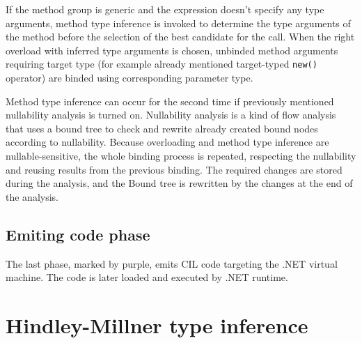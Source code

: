 If the method group is generic and the expression doesn’t specify any type arguments, method type inference is invoked to determine the type arguments of the method before the selection of the best candidate for the call.
When the right overload with inferred type arguments is chosen, unbinded method arguments requiring target type (for example already mentioned target-typed \texttt{new()} operator) are binded using corresponding parameter type.
\par
Method type inference can occur for the second time if previously mentioned nullability analysis is turned on. 
Nullability analysis is a kind of flow analysis that uses a bound tree to check and rewrite already created bound nodes according to nullability. 
Because overloading and method type inference are nullable-sensitive, the whole binding process is repeated, respecting the nullability and reusing results from the previous binding. 
The required changes are stored during the analysis, and the Bound tree is rewritten by the changes at the end of the analysis.

\subsection{Emiting code phase}

The last phase, marked by purple, emits \ac{CIL} code targeting the .NET virtual machine.
The code is later loaded and executed by .NET runtime.

\section{Hindley-Millner type inference} \label{sect03:HM}

